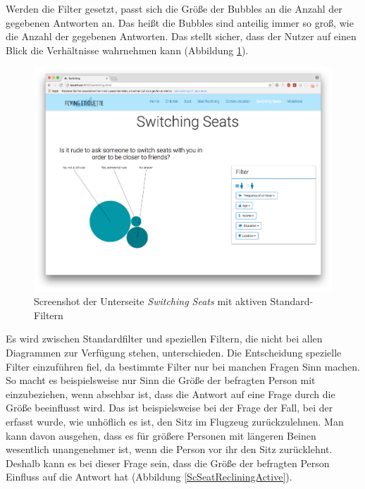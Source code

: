 \documentclass{mi-seminar}
\begin{document}
Werden die Filter gesetzt, passt sich die Größe der Bubbles an die Anzahl der gegebenen Antworten an. Das heißt die Bubbles sind anteilig immer so groß, wie die Anzahl der gegebenen Antworten. Das stellt sicher, dass der Nutzer auf einen Blick die Verhältnisse wahrnehmen kann (Abbildung \ref{ScSwitchingSeatsActive}).  
\begin{figure}
\includegraphics[scale=0.5]{assets/filter_standard_active.png}
\caption{Screenshot der Unterseite \textit{Switching Seats} mit aktiven Standard-Filtern}
\label{ScSwitchingSeatsActive}
\end{figure}
Es wird zwischen Standardfilter und speziellen Filtern, die nicht bei allen Diagrammen zur Verfügung stehen, unterschieden. Die Entscheidung spezielle Filter einzuführen fiel, da bestimmte Filter nur bei manchen Fragen Sinn machen. So macht es beispielsweise nur Sinn die Größe der befragten Person mit einzubeziehen, wenn absehbar ist, dass die Antwort auf eine Frage durch die Größe beeinflusst wird. Das ist beispielsweise bei der Frage der Fall, bei der erfasst wurde, wie unhöflich es ist, den Sitz im Flugzeug zurückzulehnen. Man kann davon ausgehen, dass es für größere Personen mit längeren Beinen wesentlich unangenehmer ist, wenn die Person vor ihr den Sitz zurücklehnt. Deshalb kann es bei dieser Frage sein, dass die Größe der befragten Person Einfluss auf die Antwort hat (Abbildung \ref{ScSeatRecliningActive}).
\end{document}
